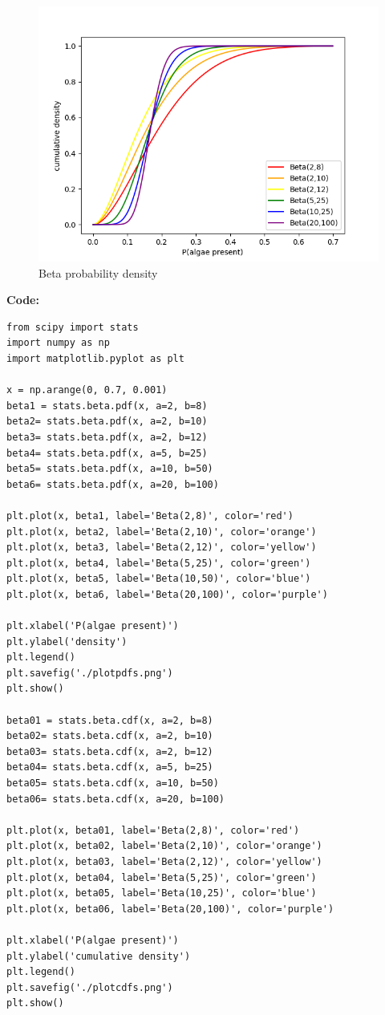 \documentclass{article}
\begin{document}
\begin{figure}[H]
\centering  
\includegraphics[scale=0.6]{plotcdfs.png}
\caption{Beta probability density}
\label{fig: label}
\end{figure}

\textbf{Code:}
\begin{verbatim}   
from scipy import stats
import numpy as np
import matplotlib.pyplot as plt

x = np.arange(0, 0.7, 0.001)
beta1 = stats.beta.pdf(x, a=2, b=8)
beta2= stats.beta.pdf(x, a=2, b=10)
beta3= stats.beta.pdf(x, a=2, b=12)
beta4= stats.beta.pdf(x, a=5, b=25)
beta5= stats.beta.pdf(x, a=10, b=50)
beta6= stats.beta.pdf(x, a=20, b=100)

plt.plot(x, beta1, label='Beta(2,8)', color='red')
plt.plot(x, beta2, label='Beta(2,10)', color='orange')
plt.plot(x, beta3, label='Beta(2,12)', color='yellow')
plt.plot(x, beta4, label='Beta(5,25)', color='green')
plt.plot(x, beta5, label='Beta(10,50)', color='blue')
plt.plot(x, beta6, label='Beta(20,100)', color='purple')

plt.xlabel('P(algae present)')
plt.ylabel('density')
plt.legend()
plt.savefig('./plotpdfs.png')
plt.show()

beta01 = stats.beta.cdf(x, a=2, b=8)
beta02= stats.beta.cdf(x, a=2, b=10)
beta03= stats.beta.cdf(x, a=2, b=12)
beta04= stats.beta.cdf(x, a=5, b=25)
beta05= stats.beta.cdf(x, a=10, b=50)
beta06= stats.beta.cdf(x, a=20, b=100)

plt.plot(x, beta01, label='Beta(2,8)', color='red')
plt.plot(x, beta02, label='Beta(2,10)', color='orange')
plt.plot(x, beta03, label='Beta(2,12)', color='yellow')
plt.plot(x, beta04, label='Beta(5,25)', color='green')
plt.plot(x, beta05, label='Beta(10,25)', color='blue')
plt.plot(x, beta06, label='Beta(20,100)', color='purple')

plt.xlabel('P(algae present)')
plt.ylabel('cumulative density')
plt.legend()
plt.savefig('./plotcdfs.png')
plt.show()
\end{verbatim}
\end{document}
